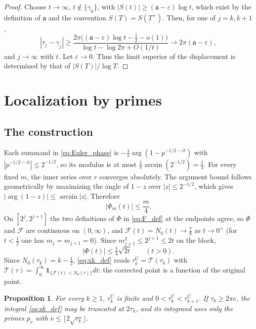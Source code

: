 \documentclass[11pt,a4paper]{article}
\makeatletter
\numberwithin{equation}{section}
\DeclareRobustCommand{\CGeqref}[1]{\eqref{#1}}
\let\CG@origeqref\eqref
\newcommand{\CG@gettip}[1]{\@ifundefined{CGTip@#1}{#1}{\csname CGTip@#1\endcsname}}
\DeclareRobustCommand{\CGeqref}[1]{\pdftooltip{\CG@origeqref{#1}}{\CG@gettip{#1}}}
\newtheorem{proposition}[theorem]{Proposition}
\theoremstyle{definition}
\theoremstyle{remark}
\newcommand{\Nz}{N_0} %
\newcommand{\Fc}{\mathcal F}
\newcommand{\Tc}{\mathcal T}
\newcommand{\Ph}{\Phi}
\newcommand{\Ind}{\mathbf 1}
\makeatother
\begin{document}
\begin{proof}
Choose $t\to\infty$, $t\notin\{\gamma_k\}$, with $|S(t)|\ge(\mathfrak a-\varepsilon)\log t$, which exist by the definition of $\mathfrak a$ and the convention $S(T)=S(T^+)$. Then, for one of $j=k,k+1$,
\begin{equation}
|\tau_j-\gamma_j|\ge\frac{2\pi\bigl((\mathfrak a-\varepsilon)\log t-\frac12-o(1)\bigr)}{\log t-\log2\pi+O(1/t)}\longrightarrow2\pi(\mathfrak a-\varepsilon),
\label{eq:disp_19}
\end{equation}
and $j\to\infty$ with $t$. Let $\varepsilon\to0$. Thus the limit superior of the displacement is determined by that of $|S(T)|/\log T$.
\end{proof}

\section{Localization by primes}\label{sec:sublevel}

\subsection{The construction}\label{subsec:construction}
Each summand in \CGeqref{eq:Euler_phase} is $-\frac1\pi\arg(1-p^{-1/2-it})$ with $|p^{-1/2-it}|\le2^{-1/2}$, so its modulus is at most $\frac1\pi\arcsin(2^{-1/2})=\frac14$. For every fixed $m$, the inner series over $r$ converges absolutely. The argument bound follows geometrically by maximizing the angle of $1-z$ over $|z|\le2^{-1/2}$, which gives $|\arg(1-z)|\le\arcsin|z|$. Therefore
\begin{equation}
|\Ph_m(t)|\le\frac m4 .
\label{eq:phasebound}
\end{equation}
On $[2^j,2^{j+1}]$ the two definitions of $\Ph$ in \CGeqref{eq:F_def} at the endpoints agree, so $\Ph$ and $\Fc$ are continuous on $(0,\infty)$, and $\Fc(t)=\Nz(t)\to\frac78$ as $t\to0^+$ (for $t<\frac12$ one has $m_j=m_{j+1}=0$). Since $m_{j+1}^2\le2^{j+1}\le2t$ on the block,
\begin{equation}
|\Ph(t)|\le\tfrac14\sqrt{2t}\qquad(t>0).
\label{eq:globalphasebound}
\end{equation}
Since $\Nz(\tau_k)=k-\frac12$, \CGeqref{eq:xk_def} reads $\tau_{k}^{\mathrm C}=\Tc(\tau_k)$ with $\Tc(\tau)=\int_0^\infty\Ind_{\{\Fc(t)<\Nz(\tau)\}}dt$: the corrected point is a function of the original point.

\begin{proposition}\label{prop:ordered}
For every $k\ge1$, $\tau_{k}^{\mathrm C}$ is finite and $0<\tau_{k}^{\mathrm C}<\tau_{k+1}^{\mathrm C}$. If $\tau_k\ge2\pi e$, the integral \CGeqref{eq:xk_def} may be truncated at $2\tau_k$, and its integrand uses only the primes $p_\nu$ with $\nu\le\lfloor2\sqrt{\tau_k}\rfloor$.
\end{proposition}
\end{document}
